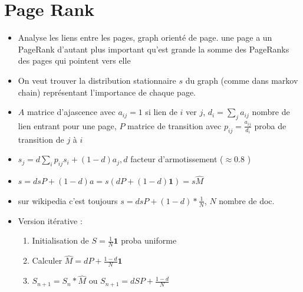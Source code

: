 \documentclass{article}
\theoremstyle{plain}%
\theoremstyle{definition}
\theoremstyle{remark}
\begin{document}
\section{Page Rank}
\begin{itemize}
    \item Analyse les liens entre les pages, graph orienté de page. une page a un PageRank d'autant plus important qu'est grande la somme des PageRanks des pages qui pointent vers elle
    \item On veut trouver la distribution stationnaire $ s $ du graph (comme dans markov chain) représentant l'importance de chaque page.
    \item $ A $ matrice d'ajascence avec $ a_{ij} = 1$ si lien de $ i $ ver $ j $, $ d_i = \sum_{j}^{} a_{ij} $ nombre de lien entrant pour une page, $ P $ matrice de transition avec $ p_{ij} = \frac{a_{ij}}{d_i}$ proba de transition de $ j $ à $ i $ 
    \item $ s_j = d \sum_{i}^{}p_{ij} s_i + (1 - d) a_j, d$ facteur d'armotissement ($ \approx 0.8 $ )
    \item $ s = dsP + (1-d)a  = s (d P + (1 - d) \mathbf{1}) = s \hat{M}$ 
    \item sur wikipedia c'est toujours $ s = dsP + (1-d)* \frac{1}{N} $, $ N $ nombre de doc.
    \item Version itérative : \begin{enumerate}
        \item Initialisation de $ S = \frac{1}{N} \mathbf{1} $ proba uniforme
        \item Calculer $ \hat{M} = dP + \frac{1-d}{N} \mathbf{1} $ 
        \item $ S_{n+1} = S_n * \hat{M} $ ou $ S_{n+1} = d SP + \frac{1- d}{N} $  
    \end{enumerate}
\end{itemize}
\end{document}
